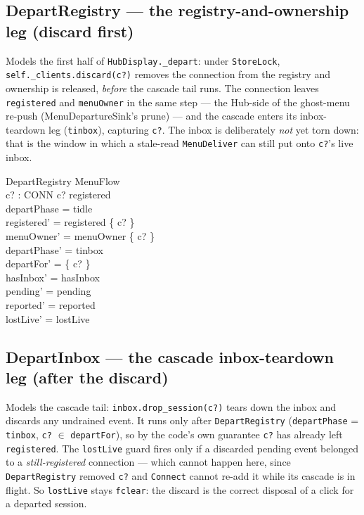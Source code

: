 \documentclass[a4paper,10pt,fleqn]{article}
\begin{document}
\subsection{DepartRegistry --- the registry-and-ownership leg (discard first)}
\label{sec:departregistry}

Models the first half of \texttt{HubDisplay.\_depart}: under \texttt{StoreLock},
\texttt{self.\_clients.discard(c?)} removes the connection from the registry and
ownership is released, \emph{before} the cascade tail runs. The connection
leaves \texttt{registered} and \texttt{menuOwner} in the same step --- the
Hub-side of the ghost-menu re-push (MenuDepartureSink's prune) --- and the
cascade enters its inbox-teardown leg (\texttt{tinbox}), capturing \texttt{c?}.
The inbox is deliberately \emph{not} yet torn down: that is the window in which
a stale-read \texttt{MenuDeliver} can still put onto \texttt{c?}'s live inbox.

\begin{schema}{DepartRegistry}
  \Delta MenuFlow \\
  c? : CONN
\where
  c? \in registered \\
  departPhase = tidle \\
  registered' = registered \setminus \{ c? \} \\
  menuOwner' = menuOwner \setminus \{ c? \} \\
  departPhase' = tinbox \\
  departFor' = \{ c? \} \\
  hasInbox' = hasInbox \\
  pending' = pending \\
  reported' = reported \\
  lostLive' = lostLive
\end{schema}

\subsection{DepartInbox --- the cascade inbox-teardown leg (after the discard)}
\label{sec:departinbox}

Models the cascade tail: \texttt{inbox.drop\_session(c?)} tears down the inbox
and discards any undrained event. It runs only after \texttt{DepartRegistry}
(\texttt{departPhase} = \texttt{tinbox}, \texttt{c?} $\in$ \texttt{departFor}),
so by the code's own guarantee \texttt{c?} has already left \texttt{registered}.
The \texttt{lostLive} guard fires only if a discarded pending event belonged to
a \emph{still-registered} connection --- which cannot happen here, since
\texttt{DepartRegistry} removed \texttt{c?} and \texttt{Connect} cannot re-add
it while its cascade is in flight. So \texttt{lostLive} stays \texttt{fclear}:
the discard is the correct disposal of a click for a departed session.
\end{document}
